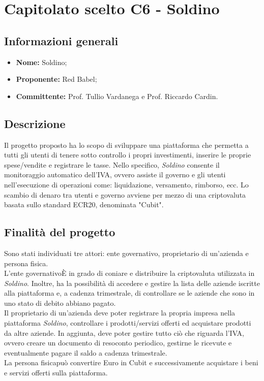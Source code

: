 \section{Capitolato scelto C6 - Soldino}
\subsection{Informazioni generali}
% 
\begin{itemize}
\item \textbf{Nome:} Soldino;
\item \textbf{Proponente:} Red Babel;
\item \textbf{Committente:} Prof. Tullio Vardanega e Prof. Riccardo Cardin.
\end{itemize}

\subsection{Descrizione}
Il progetto proposto ha lo scopo di sviluppare una piattaforma che permetta a 
tutti gli utenti di tenere sotto controllo i propri investimenti, inserire le 
proprie spese/vendite e registrare le tasse. Nello specifico, \textit{Soldino} 
consente il monitoraggio automatico dell'IVA, ovvero assiste il governo e gli 
utenti nell'esecuzione di operazioni come: liquidazione, versamento, rimborso, 
ecc. Lo scambio di denaro tra utenti e governo avviene per mezzo di una 
criptovaluta basata sullo standard ECR20\glo{}, denominata "Cubit"\glo{}. 


\subsection{Finalità del progetto}
Sono stati individuati tre attori: ente governativo, proprietario di un'azienda 
e persona fisica. \\
L'ente governativo\`E in grado di coniare e distribuire la 
criptovaluta utilizzata in \textit{Soldino}. Inoltre, ha la possibilità di 
accedere e gestire la lista delle aziende iscritte alla piattaforma e, a cadenza 
trimestrale, di controllare se le aziende che sono in uno stato di debito 
abbiano pagato. \\
Il proprietario di un'azienda deve poter registrare la propria 
impresa nella piattaforma \textit{Soldino}, controllare i prodotti/servizi 
offerti ed acquistare prodotti da altre aziende. In aggiunta, deve poter gestire
tutto ciò che riguarda l'IVA, ovvero creare un documento di resoconto periodico,
gestirne le ricevute e eventualmente pagare il saldo a cadenza trimestrale. \\
La persona fisica\glo può convertire Euro in Cubit e 
successivamente acquistare i beni e servizi offerti sulla piattaforma. 

